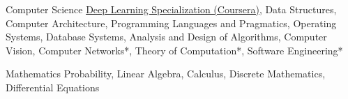 

\begin{cvskills}

  \cvskill
    {Computer Science} %
    {{\href{https://www.coursera.org/specializations/deep-learning}{Deep Learning Specialization (Coursera)}}, Data Structures, Computer Architecture, Programming Languages \newline and Pragmatics, Operating Systems, Database Systems, Analysis and Design of Algorithms, Computer Vision, Computer Networks*, Theory of Computation*, Software Engineering*} %


  \cvskill
    {Mathematics} %
    {Probability, Linear Algebra, Calculus, Discrete Mathematics, Differential Equations} %


\end{cvskills}
